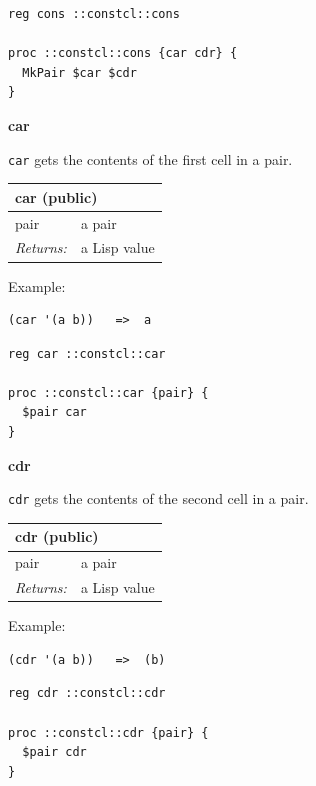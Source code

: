 \documentclass[twoside,9pt]{report}
\begin{document}
\noindent\makebox[\linewidth]{\rule{\linewidth}{0.4pt}}
\begin{lstlisting}
reg cons ::constcl::cons
 
proc ::constcl::cons {car cdr} {
  MkPair $car $cdr
}
\end{lstlisting}
\noindent\makebox[\linewidth]{\rule{\linewidth}{0.4pt}}

\textbf{car}


\texttt{car} gets the contents of the first cell in a pair.

\begin{tabular}{ |l l| }
\hline
\multicolumn{2}{|l|}{car (public)} \\
\hline
pair & a pair \\
\textit{Returns:} & a Lisp value \\
\hline
\end{tabular}


Example:

\noindent\makebox[\linewidth]{\rule{\linewidth}{0.4pt}}
\begin{lstlisting}
(car '(a b))   =>  a
\end{lstlisting}
\noindent\makebox[\linewidth]{\rule{\linewidth}{0.4pt}}
\noindent\makebox[\linewidth]{\rule{\linewidth}{0.4pt}}
\begin{lstlisting}
reg car ::constcl::car
 
proc ::constcl::car {pair} {
  $pair car
}
\end{lstlisting}
\noindent\makebox[\linewidth]{\rule{\linewidth}{0.4pt}}

\textbf{cdr}


\texttt{cdr} gets the contents of the second cell in a pair.

\begin{tabular}{ |l l| }
\hline
\multicolumn{2}{|l|}{cdr (public)} \\
\hline
pair & a pair \\
\textit{Returns:} & a Lisp value \\
\hline
\end{tabular}


Example:

\noindent\makebox[\linewidth]{\rule{\linewidth}{0.4pt}}
\begin{lstlisting}
(cdr '(a b))   =>  (b)
\end{lstlisting}
\noindent\makebox[\linewidth]{\rule{\linewidth}{0.4pt}}
\noindent\makebox[\linewidth]{\rule{\linewidth}{0.4pt}}
\begin{lstlisting}
reg cdr ::constcl::cdr
 
proc ::constcl::cdr {pair} {
  $pair cdr
}
\end{lstlisting}
\noindent\makebox[\linewidth]{\rule{\linewidth}{0.4pt}}
\end{document}
